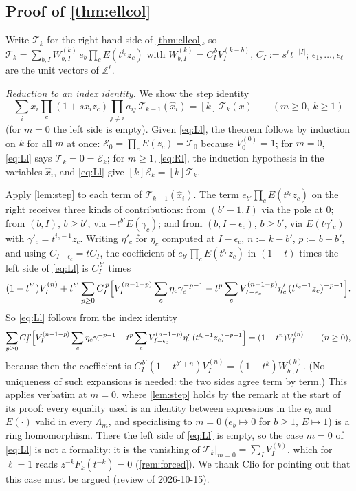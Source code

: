 \documentclass[11pt]{amsart}
\theoremstyle{definition}
\theoremstyle{remark}
\numberwithin{equation}{section}
\newcommand{\Lam}{\Lambda}
\newcommand{\hx}{\hat x}
\begin{document}
\subsection{Proof of \cref{thm:ellcol}}
Write $\mathcal T_k$ for the right-hand side of \cref{thm:ellcol}, so $\mathcal T_k=\sum_{b,I}W^{(k)}_{b,I}\,e_b\prod_cE(t^{i_c}z_c)$ with $W^{(k)}_{b,I}=C_I^{\,b}V^{(k-b)}_I$, $C_I:=s^\ell t^{-|I|}$; $\epsilon_1,\dots,\epsilon_\ell$ are the unit vectors of $\mathbb{Z}^\ell$.

\emph{Reduction to an index identity.} We show the step identity
\begin{equation}\label{eq:Ll}
\sum_ix_i\prod_c(1+sx_iz_c)\prod_{j\ne i}a_{ij}\,\mathcal T_{k-1}(\hx_i)=[k]\,\mathcal T_k(x)\qquad(m\ge0,\ k\ge1)
\end{equation}
(for $m=0$ the left side is empty). Given \eqref{eq:Ll}, the theorem follows by induction on $k$ for all $m$ at once: $\mathcal E_0=\prod_cE(z_c)=\mathcal T_0$ because $V^{(0)}_{0}=1$; for $m=0$, \eqref{eq:Ll} says $\mathcal T_k=0=\mathcal E_k$; for $m\ge1$, \eqref{eq:Rl}, the induction hypothesis in the variables $\hx_i$, and \eqref{eq:Ll} give $[k]\mathcal E_k=[k]\mathcal T_k$.

Apply \cref{lem:step} to each term of $\mathcal T_{k-1}(\hx_i)$. The term $e_{b'}\prod_cE(t^{i_c}z_c)$ on the right receives three kinds of contributions: from $(b'-1,I)$ via the pole at $0$; from $(b,I)$, $b\ge b'$, via $-t^{b'}E(\gamma_c)$; and from $(b,I-\epsilon_c)$, $b\ge b'$, via $E(t\gamma'_c)$ with $\gamma'_c=t^{i_c-1}z_c$. Writing $\eta'_c$ for $\eta_c$ computed at $I-\epsilon_c$, $n:=k-b'$, $p:=b-b'$, and using $C_{I-\epsilon_c}=tC_I$, the coefficient of $e_{b'}\prod_cE(t^{i_c}z_c)$ in $(1-t)$ times the left side of \eqref{eq:Ll} is $C_I^{\,b'}$ times
\[ (1-t^{b'})V^{(n)}_I+t^{b'}\sum_{p\ge0}C_I^{\,p}\Bigl[V^{(n-1-p)}_I\sum_c\eta_c\gamma_c^{-p-1}-t^p\sum_cV^{(n-1-p)}_{I-\epsilon_c}\eta'_c\,(t^{i_c-1}z_c)^{-p-1}\Bigr]. \]
So \eqref{eq:Ll} follows from the index identity
\begin{equation}\label{eq:starl}
\sum_{p\ge0}C_I^{\,p}\Bigl[V^{(n-1-p)}_I\sum_c\eta_c\gamma_c^{-p-1}-t^p\sum_cV^{(n-1-p)}_{I-\epsilon_c}\eta'_c\,(t^{i_c-1}z_c)^{-p-1}\Bigr]=(1-t^n)V^{(n)}_I\qquad(n\ge0),
\end{equation}
because then the coefficient is $C_I^{\,b'}(1-t^{b'+n})V^{(n)}_I=(1-t^k)W^{(k)}_{b',I}$. (No uniqueness of such expansions is needed: the two sides agree term by term.) This applies verbatim at $m=0$, where \cref{lem:step} holds by the remark at the start of its proof: every equality used is an identity between expressions in the $e_b$ and $E(\cdot)$ valid in every $\Lam_m$, and specialising to $m=0$ ($e_b\mapsto0$ for $b\ge1$, $E\mapsto1$) is a ring homomorphism. There the left side of \eqref{eq:Ll} is empty, so the case $m=0$ of \eqref{eq:Ll} is not a formality: it is the vanishing of $\mathcal T_k|_{m=0}=\sum_IV^{(k)}_I$, which for $\ell=1$ reads $z^{-k}F_k(t^{-k})=0$ (\cref{rem:forced}). We thank Clio for pointing out that this case must be argued (review of 2026-10-15).
\end{document}
